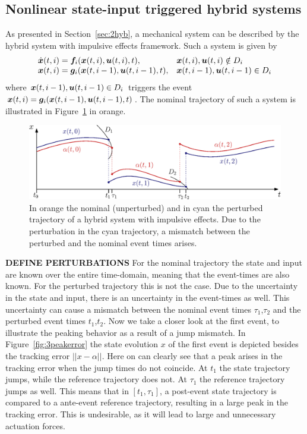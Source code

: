 \documentclass[../DC2017114Bouma.tex]{subfiles}
\begin{document}
\subsection{Nonlinear state-input triggered hybrid systems}
As presented in Section~\ref{sec:2hyb}, a mechanical system can be described by the hybrid system with impulsive effects framework. Such a system is given by
\begin{equation}
\begin{array}{ll}
\dot{{\boldsymbol{x}}}(t,i) ={\boldsymbol{f}}_i({\boldsymbol{x}}(t,i),{\boldsymbol{u}}(t,i),t),& {\boldsymbol{x}}(t,i),{\boldsymbol{u}}(t,i)\notin D_i\\
{\boldsymbol{x}}(t,i) = {\boldsymbol{g}}_i({\boldsymbol{x}}(t,i-1),{\boldsymbol{u}}(t,i-1),t),& {\boldsymbol{x}}(t,i-1),{\boldsymbol{u}}(t,i-1)\in D_i
\end{array}\label{eq:3hybimp}
\end{equation}
where ${\boldsymbol{x}}(t,i-1),{\boldsymbol{u}}(t,i-1)\in D_i$ triggers the event ${\boldsymbol{x}}(t,i) = {\boldsymbol{g}}_i({\boldsymbol{x}}(t,i-1),{\boldsymbol{u}}(t,i-1),t)$. The nominal trajectory of such a system is illustrated in Figure~\ref{fig:3perturbedtraj} in orange.
\begin{figure}[h]
\centering
\includegraphics[width=.8\textwidth]{perturbedtraj.eps}\caption{In orange the nominal (unperturbed) and in cyan the perturbed trajectory of a hybrid system with impulsive effects. Due to the perturbation in the cyan trajectory, a mismatch between the perturbed and the nominal event times arises.} \label{fig:3perturbedtraj}
\end{figure}
\textbf{DEFINE PERTURBATIONS} For the nominal trajectory the state and input are known over the entire time-domain, meaning that the event-times are also known. For the perturbed trajectory this is not the case. Due to the uncertainty in the state and input, there is an uncertainty in the event-times as well. This uncertainty can cause a mismatch between the nominal event times $\tau_1$,$\tau_2$ and the perturbed event times $t_1$,$t_2$. Now we take a closer look at the first event, to illustrate the peaking behavior as a result of a jump mismatch. In Figure~\ref{fig:3peakerror} the state evolution $x$ of the first event is depicted besides the tracking error $||x-\alpha||$. Here on can clearly see that a peak arises in the tracking error when the jump times do not coincide. At $t_1$ the state trajectory jumps, while the reference trajectory does not. At $\tau_1$ the reference trajectory jumps as well. This means that in $[t_1,\tau_1]$, a post-event state trajectory is compared to a ante-event reference trajectory, resulting in a large peak in the tracking error. This is undesirable, as it will lead to large and unnecessary actuation forces.
\end{document}
